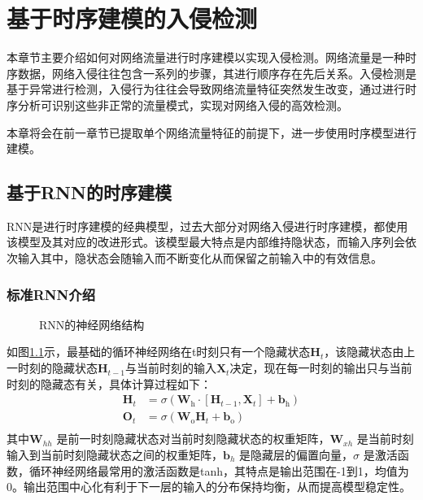\chapter{基于时序建模的入侵检测}
本章节主要介绍如何对网络流量进行时序建模以实现入侵检测。网络流量是一种时序数据，网络入侵往往包含一系列的步骤，其进行顺序存在先后关系。入侵检测是基于异常进行检测，入侵行为往往会导致网络流量特征突然发生改变，通过进行时序分析可识别这些非正常的流量模式，实现对网络入侵的高效检测。

本章将会在前一章节已提取单个网络流量特征的前提下，进一步使用时序模型进行建模。

\section{基于RNN的时序建模}
RNN是进行时序建模的经典模型，过去大部分对网络入侵进行时序建模，都使用该模型及其对应的改进形式。该模型最大特点是内部维持隐状态，而输入序列会依次输入其中，隐状态会随输入而不断变化从而保留之前输入中的有效信息。
\subsection{标准RNN介绍}
\begin{figure}[htbp]
    \centering
    
    \caption{RNN的神经网络结构\cite{zhang2023dive}}
    \label{fig:rnn_struct}
\end{figure}
如图\ref{fig:rnn_struct}示，最基础的循环神经网络在t时刻只有一个隐藏状态$\mathbf{H}_{t}$，该隐藏状态由上一时刻的隐藏状态$\mathbf{H}_{t-1}$与当前时刻的输入$\mathbf{X}_{t}$决定，现在每一时刻的输出只与当前时刻的隐藏态有关，具体计算过程如下：
\begin{equation}
\begin{aligned}
\mathbf{H}_{t} &= \sigma(\mathbf{W}_{\mathrm{h}} \cdot [\mathbf{H}_{t-1}, \mathbf{X}_t] + \mathbf{b}_{\mathrm{h}})\\
\mathbf{O}_{t} &= \sigma(\mathbf{W}_{\mathrm{o}}\mathbf{H}_{t} + \mathbf{b}_{\mathrm{o}})\\
\end{aligned}
\end{equation}
其中$\mathbf{W}_{hh}$ 是前一时刻隐藏状态对当前时刻隐藏状态的权重矩阵，$\mathbf{W}_{xh}$ 是当前时刻输入到当前时刻隐藏状态之间的权重矩阵，$\mathbf{b}_{h}$ 是隐藏层的偏置向量，$\sigma$ 是激活函数，循环神经网络最常用的激活函数是tanh，其特点是输出范围在-1到1，均值为0。输出范围中心化有利于下一层的输入的分布保持均衡，从而提高模型稳定性。


